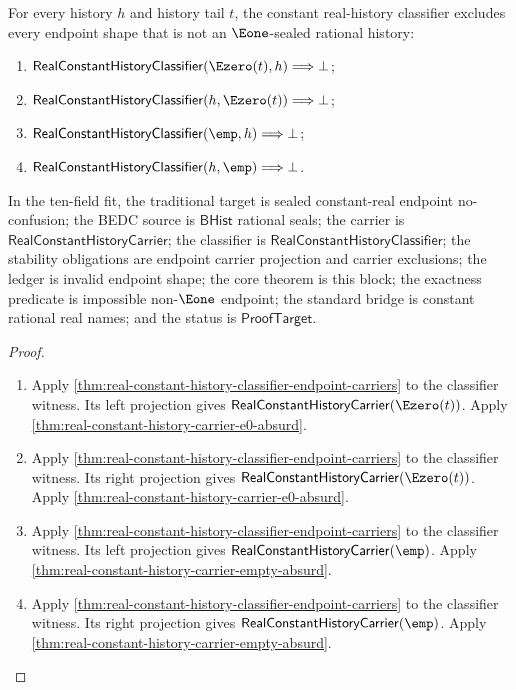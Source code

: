 \begin{theorem}
\label{thm:real-constant-history-classifier-invalid-endpoint-absurd}
For every history $h$ and history tail $t$, the constant real-history classifier
excludes every endpoint shape that is not an $\Eone$-sealed rational history:
\begin{enumerate}
  \item $\mathsf{RealConstantHistoryClassifier}(\Ezero(t),h)\Longrightarrow\bot$;
  \item $\mathsf{RealConstantHistoryClassifier}(h,\Ezero(t))\Longrightarrow\bot$;
  \item $\mathsf{RealConstantHistoryClassifier}(\emp,h)\Longrightarrow\bot$;
  \item $\mathsf{RealConstantHistoryClassifier}(h,\emp)\Longrightarrow\bot$.
\end{enumerate}
In the ten-field fit, the traditional target is sealed constant-real endpoint
no-confusion; the BEDC source is $\mathsf{BHist}$ rational seals; the carrier is
$\mathsf{RealConstantHistoryCarrier}$; the classifier is
$\mathsf{RealConstantHistoryClassifier}$; the stability obligations are endpoint
carrier projection and carrier exclusions; the ledger is invalid endpoint shape;
the core theorem is this block; the exactness predicate is impossible
non-$\Eone$ endpoint; the standard bridge is constant rational real names; and
the status is $\mathsf{ProofTarget}$.
\end{theorem}
\begin{proof}
\begin{enumerate}
  \item Apply
  \autoref{thm:real-constant-history-classifier-endpoint-carriers} to the
  classifier witness. Its left projection gives
  $\mathsf{RealConstantHistoryCarrier}(\Ezero(t))$. Apply
  \autoref{thm:real-constant-history-carrier-e0-absurd}.

  \item Apply
  \autoref{thm:real-constant-history-classifier-endpoint-carriers} to the
  classifier witness. Its right projection gives
  $\mathsf{RealConstantHistoryCarrier}(\Ezero(t))$. Apply
  \autoref{thm:real-constant-history-carrier-e0-absurd}.

  \item Apply
  \autoref{thm:real-constant-history-classifier-endpoint-carriers} to the
  classifier witness. Its left projection gives
  $\mathsf{RealConstantHistoryCarrier}(\emp)$. Apply
  \autoref{thm:real-constant-history-carrier-empty-absurd}.

  \item Apply
  \autoref{thm:real-constant-history-classifier-endpoint-carriers} to the
  classifier witness. Its right projection gives
  $\mathsf{RealConstantHistoryCarrier}(\emp)$. Apply
  \autoref{thm:real-constant-history-carrier-empty-absurd}.
\end{enumerate}
\end{proof}

